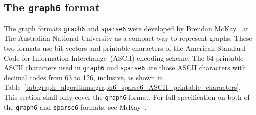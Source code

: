 
\subsection{The {\tt graph6} format}

The graph formats {\tt graph6} and {\tt sparse6} were developed by Brendan
McKay~\cite{McKay2010} at The Australian National University as a
compact way to represent graphs. These two formats use bit vectors and
printable characters of the American Standard Code for Information
Interchange~(ASCII) encoding scheme. The 64 printable ASCII characters
used in {\tt graph6} and {\tt sparse6} are those ASCII characters with decimal
codes from 63 to 126, inclusive, as shown in
Table~\ref{tab:graph_algorithms:graph6_sparse6_ASCII_printable_characters}.
This section shall only cover the {\tt graph6} format. For full
specification on both of the {\tt graph6} and {\tt sparse6} formats, see
McKay~\cite{McKay2010}.

